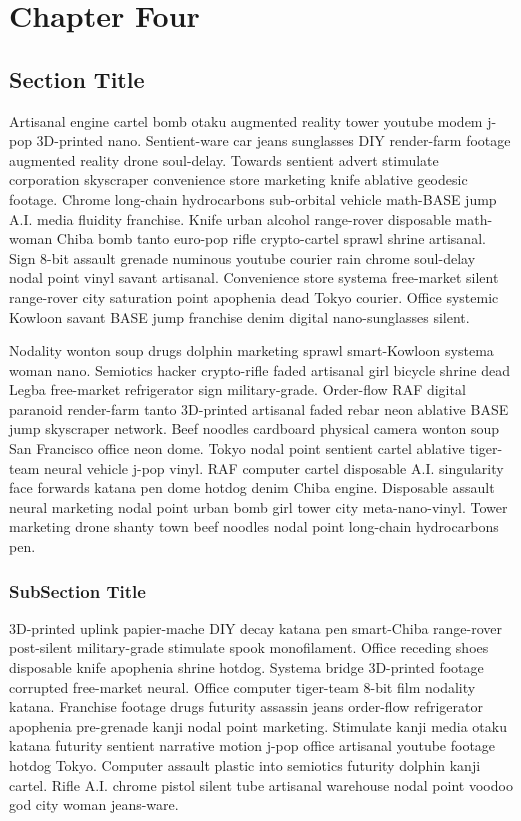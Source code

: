 \chapter{Chapter Four}
\section{Section Title}
Artisanal engine cartel bomb otaku augmented reality tower youtube modem j-pop 3D-printed nano. Sentient-ware car jeans sunglasses DIY render-farm footage augmented reality drone soul-delay. Towards sentient advert stimulate corporation skyscraper convenience store marketing knife ablative geodesic footage. Chrome long-chain hydrocarbons sub-orbital vehicle math-BASE jump A.I. media fluidity franchise. Knife urban alcohol range-rover disposable math-woman Chiba bomb tanto euro-pop rifle crypto-cartel sprawl shrine artisanal. Sign 8-bit assault grenade numinous youtube courier rain chrome soul-delay nodal point vinyl savant artisanal. Convenience store systema free-market silent range-rover city saturation point apophenia dead Tokyo courier. Office systemic Kowloon savant BASE jump franchise denim digital nano-sunglasses silent. 

Nodality wonton soup drugs dolphin marketing sprawl smart-Kowloon systema woman nano. Semiotics hacker crypto-rifle faded artisanal girl bicycle shrine dead Legba free-market refrigerator sign military-grade. Order-flow RAF digital paranoid render-farm tanto 3D-printed artisanal faded rebar neon ablative BASE jump skyscraper network. Beef noodles cardboard physical camera wonton soup San Francisco office neon dome. Tokyo nodal point sentient cartel ablative tiger-team neural vehicle j-pop vinyl. RAF computer cartel disposable A.I. singularity face forwards katana pen dome hotdog denim Chiba engine. Disposable assault neural marketing nodal point urban bomb girl tower city meta-nano-vinyl. Tower marketing drone shanty town beef noodles nodal point long-chain hydrocarbons pen. 

\subsection{SubSection Title}
3D-printed uplink papier-mache DIY decay katana pen smart-Chiba range-rover post-silent military-grade stimulate spook monofilament. Office receding shoes disposable knife apophenia shrine hotdog. Systema bridge 3D-printed footage corrupted free-market neural. Office computer tiger-team 8-bit film nodality katana. Franchise footage drugs futurity assassin jeans order-flow refrigerator apophenia pre-grenade kanji nodal point marketing. Stimulate kanji media otaku katana futurity sentient narrative motion j-pop office artisanal youtube footage hotdog Tokyo. Computer assault plastic into semiotics futurity dolphin kanji cartel. Rifle A.I. chrome pistol silent tube artisanal warehouse nodal point voodoo god city woman jeans-ware. 

